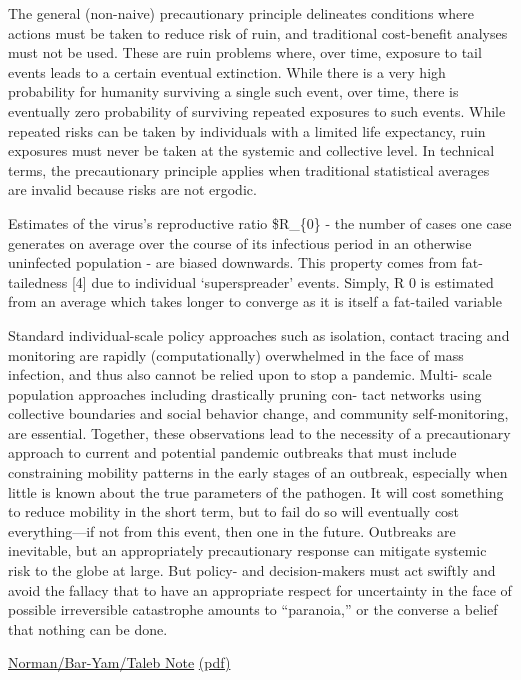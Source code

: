 \documentclass[
]{book}
\begin{document}
The general (non-naive) precautionary principle delineates conditions where actions
must be taken to reduce risk
of ruin, and traditional cost-benefit analyses must not be used.
These are ruin problems where, over time, exposure to tail
events leads to a certain eventual extinction. While there
is a very high probability for humanity surviving a single
such event, over time, there is eventually zero probability of
surviving repeated exposures to such events. While repeated
risks can be taken by individuals with a limited life expectancy,
ruin exposures must never be taken at the systemic and
collective level. In technical terms, the precautionary principle
applies when traditional statistical averages are invalid because
risks are not ergodic.

Estimates of the virus's reproductive
ratio \$R\_\{0\} - the number of cases one case generates on average
over the course of its infectious period in an otherwise
uninfected population - are biased downwards. This property
comes from fat-tailedness {[}4{]} due to individual `superspreader'
events. Simply, R 0 is estimated from an average which takes
longer to converge as it is itself a fat-tailed variable

Standard individual-scale policy approaches
such as isolation, contact tracing and monitoring are rapidly
(computationally) overwhelmed in the face of mass infection,
and thus also cannot be relied upon to stop a pandemic. Multi-
scale population approaches including drastically pruning con-
tact networks using collective boundaries and social behavior
change, and community self-monitoring, are essential.
Together, these observations lead to the necessity of a
precautionary approach to current and potential pandemic
outbreaks that must include constraining mobility patterns in
the early stages of an outbreak, especially when little is known
about the true parameters of the pathogen.
It will cost something to reduce mobility in the short term,
but to fail do so will eventually cost everything---if not from
this event, then one in the future. Outbreaks are inevitable, but
an appropriately precautionary response can mitigate systemic
risk to the globe at large. But policy- and decision-makers must
act swiftly and avoid the fallacy that to have an appropriate
respect for uncertainty in the face of possible irreversible
catastrophe amounts to ``paranoia,'' or the converse a belief
that nothing can be done.

\href{https://necsi.edu/systemic-risk-of-pandemic-via-novel-pathogens-coronavirus-a-note}{Norman/Bar-Yam/Taleb Note}
\href{/pdf/Joseph_Norman_2020_Systemic_Risk_of_Pandemic_via_Novel_Pathogenes.pdf}{(pdf)}
\end{document}
